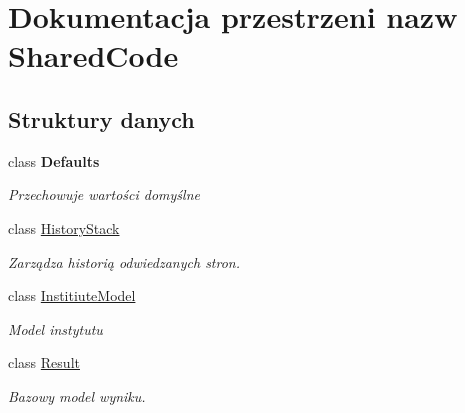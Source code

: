 \hypertarget{a00306}{}\section{Dokumentacja przestrzeni nazw Shared\+Code}
\label{a00306}
\subsection*{Struktury danych}
\begin{DoxyCompactItemize}
\item 
class {\bfseries Defaults}
\begin{DoxyCompactList}\small\item\em Przechowuje wartości domyślne \end{DoxyCompactList}\item 
class \hyperlink{a00022}{History\+Stack}
\begin{DoxyCompactList}\small\item\em Zarządza historią odwiedzanych stron. \end{DoxyCompactList}\item 
class \hyperlink{a00025}{Institiute\+Model}
\begin{DoxyCompactList}\small\item\em Model instytutu \end{DoxyCompactList}\item 
class \hyperlink{a00049}{Result}
\begin{DoxyCompactList}\small\item\em Bazowy model wyniku. \end{DoxyCompactList}\end{DoxyCompactItemize}
